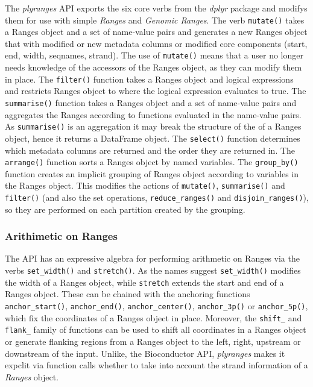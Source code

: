 \documentclass[10pt,letterpaper]{article}
\begin{document}
The \emph{plyranges} API exports the six core verbs from the
\emph{dplyr} package and modifys them for use with simple \emph{Ranges}
and \emph{Genomic Ranges}. The verb \texttt{mutate()} takes a Ranges
object and a set of name-value pairs and generates a new Ranges object
that with modified or new metadata columns or modified core components
(start, end, width, seqnames, strand). The use of \texttt{mutate()}
means that a user no longer needs knowledge of the accessors of the
Ranges object, as they can modify them in place. The \texttt{filter()}
function takes a Ranges object and logical expressions and restricts
Ranges object to where the logical expression evaluates to true. The
\texttt{summarise()} function takes a Ranges object and a set of
name-value pairs and aggregates the Ranges according to functions
evaluated in the name-value pairs. As \texttt{summarise()} is an
aggregation it may break the structure of the of a Ranges object, hence
it returns a DataFrame object. The \texttt{select()} function determines
which metadata columns are returned and the order they are returned in.
The \texttt{arrange()} function sorts a Ranges object by named
variables. The \texttt{group\_by()} function creates an implicit
grouping of Ranges object according to variables in the Ranges object.
This modifies the actions of \texttt{mutate()}, \texttt{summarise()} and
\texttt{filter()} (and also the set operations,
\texttt{reduce\_ranges()} and \texttt{disjoin\_ranges()}), so they are
performed on each partition created by the grouping.

\hypertarget{arithimetic-on-ranges}{%
\subsubsection{Arithimetic on Ranges}\label{arithimetic-on-ranges}}

The API has an expressive algebra for performing arithmetic on Ranges
via the verbs \texttt{set\_width()} and \texttt{stretch()}. As the names
suggest \texttt{set\_width()} modifies the width of a Ranges object,
while \texttt{stretch} extends the start and end of a Ranges object.
These can be chained with the anchoring functions
\texttt{anchor\_start()}, \texttt{anchor\_end()},
\texttt{anchor\_center()}, \texttt{anchor\_3p()} or
\texttt{anchor\_5p()}, which fix the coordinates of a Ranges object in
place. Moreover, the \texttt{shift\_} and \texttt{flank\_} family of
functions can be used to shift all coordinates in a Ranges object or
generate flanking regions from a Ranges object to the left, right,
upstream or downstream of the input. Unlike, the Bioconductor API,
\emph{plyranges} makes it expclit via function calls whether to take
into account the strand information of a \emph{Ranges} object.
\end{document}
